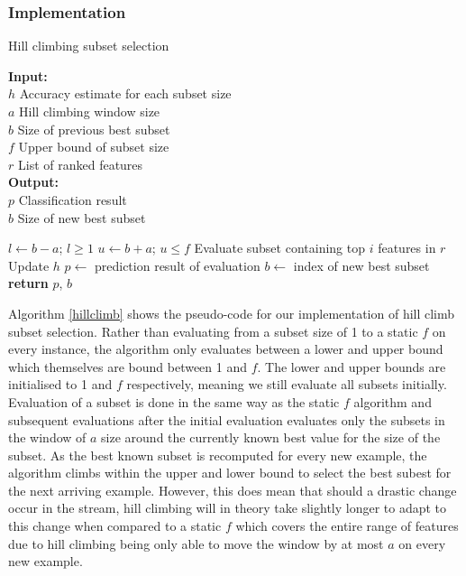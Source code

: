 \subsubsection{Implementation}

\begin{algorithm}[h]
    \caption{Hill climbing subset selection}
    \label{hillclimb}
    \textbf{Input:} \\ 
    $h$ Accuracy estimate for each subset size \\ 
    $a$ Hill climbing window size \\
    $b$ Size of previous best subset \\ 
    $f$ Upper bound of subset size \\ 
    $r$ List of ranked features \\
	\textbf{Output:} \\
	$p$ Classification result \\
	$b$ Size of new best subset
    \begin{algorithmic}[1] %
            \State $l\gets b - a$; $l\geq 1$
            \State $u\gets b + a$; $u\leq f$
            	\State Evaluate subset containing top $i$ features in $r$
            	\State Update $h$
          	  		\State $p\gets$ prediction result of evaluation
            	\EndIf
            \EndFor
            \State $b\gets$ index of new best subset
            \State \textbf{return} $p$, $b$
        \EndProcedure
    \end{algorithmic}
\end{algorithm}

Algorithm \ref{hillclimb} shows the pseudo-code for our implementation of hill climb subset selection. Rather than evaluating from a subset size of 1 to a static $f$ on every instance, the algorithm only evaluates between a lower and upper bound which themselves are bound between 1 and $f$. The lower and upper bounds are initialised to 1 and $f$ respectively, meaning we still evaluate all subsets initially. Evaluation of a subset is done in the same way as the static $f$ algorithm and subsequent evaluations after the initial evaluation evaluates only the subsets in the window of $a$ size around the currently known best value for the size of the subset. As the best known subset is recomputed for every new example, the algorithm climbs within the upper and lower bound to select the best subest for the next arriving example. However, this does mean that should a drastic change occur in the stream, hill climbing will in theory take slightly longer to adapt to this change when compared to a static $f$ which covers the entire range of features due to hill climbing being only able to move the window by at most $a$ on every new example.